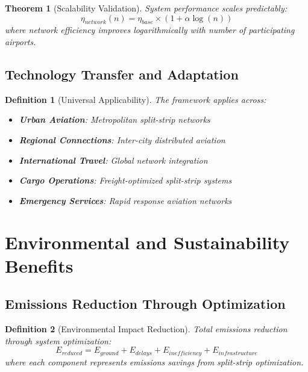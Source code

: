 \documentclass[12pt,a4paper]{article}
\newtheorem{theorem}{Theorem}
\newtheorem{definition}{Definition}
\begin{document}
\begin{theorem}[Scalability Validation]
System performance scales predictably:
\begin{equation}
\eta_{network}(n) = \eta_{base} \times \left(1 + \alpha \log(n)\right)
\end{equation}
where network efficiency improves logarithmically with number of participating airports.
\end{theorem}

\subsection{Technology Transfer and Adaptation}

\begin{definition}[Universal Applicability]
The framework applies across:
\begin{itemize}
\item \textbf{Urban Aviation}: Metropolitan split-strip networks
\item \textbf{Regional Connections}: Inter-city distributed aviation
\item \textbf{International Travel}: Global network integration
\item \textbf{Cargo Operations}: Freight-optimized split-strip systems
\item \textbf{Emergency Services}: Rapid response aviation networks
\end{itemize}
\end{definition}

\section{Environmental and Sustainability Benefits}

\subsection{Emissions Reduction Through Optimization}

\begin{definition}[Environmental Impact Reduction]
Total emissions reduction through system optimization:
\begin{equation}
E_{reduced} = E_{ground} + E_{delays} + E_{inefficiency} + E_{infrastructure}
\end{equation}
where each component represents emissions savings from split-strip optimization.
\end{definition}
\end{document}
